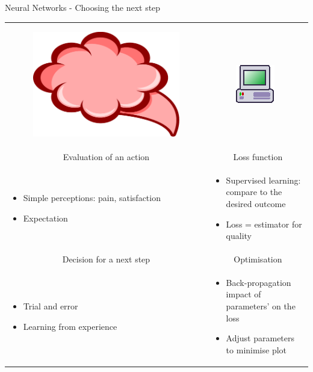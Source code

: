 \begin{frame}{Neural Networks - Choosing the next step}
\begin{tabular}{p{5cm}|p{5cm}}
    \begin{figure}
    	\includegraphics[scale = 0.09]{brain}
    \end{figure}
    & 
    \begin{figure}
    	\includegraphics[scale = 1.4]{machine}
    \end{figure} \\
  \multicolumn{1}{c|}{Evaluation of an action} & \multicolumn{1}{c}{Loss function} \\
    \begin{itemize}
        \item Simple perceptions: pain, satisfaction
        \item Expectation
    \end{itemize}
    & 
    \begin{itemize}
      \item Supervised learning: compare to the desired outcome
      \item Loss = estimator for quality
    \end{itemize} \\
\multicolumn{1}{c|}{Decision for a next step} & \multicolumn{1}{c}{Optimisation} \\
    \begin{itemize}
        \item Trial and error
        \item Learning from experience
    \end{itemize}
    & 
    \begin{itemize}
      \item Back-propagation impact of parameters' on the loss
      \item Adjust parameters to minimise plot
    \end{itemize} 
 \end{tabular}
\end{frame}


